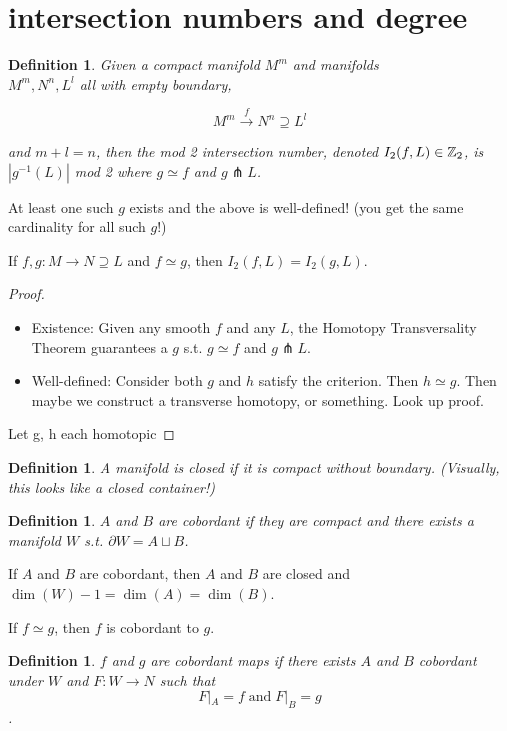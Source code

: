 \documentclass[11pt,leqno,oneside]{amsart}
\newcommand{\homotopic}{\simeq}
\renewcommand{\d}{\partial}
\newcommand{\transverse}{\pitchfork}
\newcommand{\de}{\emph}
\theoremstyle{mystyle} \newtheorem{thrm}[thm]{Theorem}
\theoremstyle{mystyle} \newtheorem{defi}[thm]{Definition}
\begin{document}
\section{intersection numbers and degree}

\begin{defi}
	Given a compact manifold $M^m$ and manifolds \\$M^m, N^n, L^l$ all with empty boundary,

	$$M^m \overset{f}{\to} N^n \supseteq L^l$$

	and $m + l = n$, then the \de{mod 2 intersection number}, denoted $I_2(f, L) \in {\mathbb Z}_2$, is $|g^{-1}(L)|$ mod 2 where $g \homotopic f$ and $g \transverse L$.
\end{defi}
\begin{prop}
	At least one such $g$ exists and the above is well-defined!  (you get the same cardinality for all such $g$!)
\end{prop}
\begin{cor}
	If $f,g: M \to N \supseteq L$ and $f \homotopic g$, then $I_2(f, L) = I_2(g, L)$.
\end{cor}
\begin{proof}
	\begin{itemize}
		\item Existence: Given any smooth $f$ and any $L$, the Homotopy Transversality Theorem guarantees a $g$ s.t. $g \homotopic f$ and $g \transverse L$.
		\item Well-defined: Consider both $g$ and $h$ satisfy the criterion.  Then $h \homotopic g$.  Then maybe we construct a transverse homotopy, or something.  Look up proof.
	\end{itemize}
		Let g, h each homotopic
\end{proof}
\begin{defi}
	A manifold is \de{closed} if it is compact without boundary.  (Visually, this looks like a closed container!)
\end{defi}
\begin{defi}
	$A$ and $B$ are \de{cobordant} if they are compact and there exists a manifold $W$ s.t. $\d W = A \sqcup B$.
\end{defi}
\begin{prop}
	If $A$ and $B$ are cobordant, then $A$ and $B$ are closed and $\dim(W)-1 = \dim(A) = \dim(B)$.
\end{prop}
\begin{prop}
	If $f \homotopic g$, then $f$ is cobordant to $g$.
\end{prop}
\begin{defi}
	$f$ and $g$ are \de{cobordant} maps if there exists $A$ and $B$ cobordant under $W$ and $F: W \to N$ such that
	$$F|_A = f \;\text{and}\; F|_B = g$$.
\end{defi}
\end{document}
